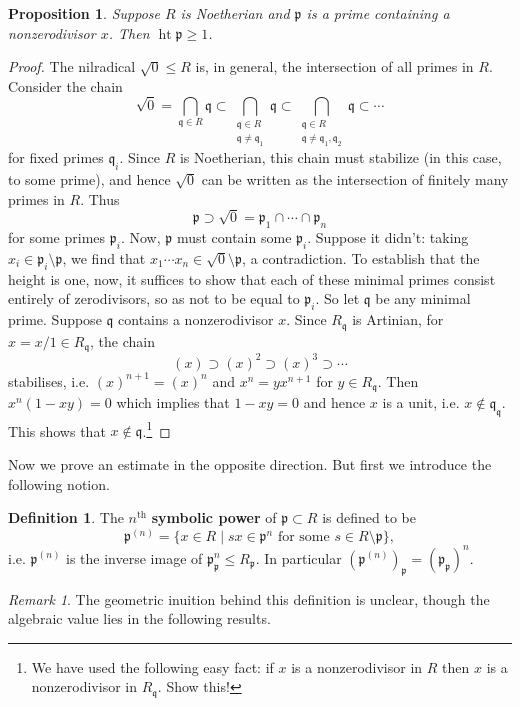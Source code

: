 \documentclass{article}
\newcommand{\fr}{\mathfrak}
\DeclareMathOperator{\hgt}{ht}
\theoremstyle{plain}
\newtheorem{prop}[thm]{Proposition}
\theoremstyle{definition}
\newtheorem{defn}{Definition}
\theoremstyle{remark}
\newtheorem*{rem}{Remark}
\begin{document}
\begin{prop}
    Suppose $R$ is Noetherian and $\fr p$ is a prime containing a nonzerodivisor $x$. Then $\hgt\fr p\geq 1$.
\end{prop}
\begin{proof}
    The nilradical $\sqrt{0}\leq R$ is, in general, the intersection of all primes in $R$. Consider the
    chain
    \[\sqrt{0}=\bigcap_{\fr q\in R}\fr q\subset \bigcap_{\substack{\fr q\in R\\\fr q\neq\fr q_1}}\fr q
        \subset \bigcap_{\substack{\fr q\in R\\\fr q\neq\fr q_1,\fr q_2}}\fr q\subset\cdots\]
    for fixed primes $\fr q_i$. Since $R$ is Noetherian, this chain must stabilize (in this case, to some prime), and hence $\sqrt{0}$
    can be written as the intersection of finitely many primes in $R$.
    Thus
    \[\fr p\supset \sqrt{0}=\fr p_1\cap\cdots\cap\fr p_n\]
    for some primes $\fr p_i$. Now, $\fr p$ must contain some
    $\fr p_i$. Suppose it didn't: taking $x_i\in \fr p_i\setminus \fr p$, we find that $x_1\cdots x_n\in\sqrt{0}\setminus\fr p$,
    a contradiction. To establish that the height is one, now, it suffices to show that each of these minimal primes
    consist entirely of zerodivisors, so as not to be equal to $\fr p_i$. So let $\fr q$ be any minimal prime.
    Suppose $\fr q$ contains a nonzerodivisor $x$. Since $R_{\fr q}$ is Artinian, for $x=x/1\in R_{\fr q}$,
    the chain
    \[(x)\supset (x)^2\supset (x)^3\supset\cdots\]
    stabilises, i.e. $(x)^{n+1}=(x)^n$ and $x^n=yx^{n+1}$ for $y\in R_{\fr q}$.
    Then $x^n(1-xy)=0$ which implies that $1-xy=0$ and hence $x$ is a unit, i.e. $x\notin \fr q_{\fr q}$. This
    shows that $x\notin\fr q$.\footnote{We have used the following easy fact: if $x$ is a
        nonzerodivisor in $R$ then $x$ is a nonzerodivisor in $R_{\fr q}$. Show this!}
\end{proof}

Now we prove an estimate in the opposite direction. But first we introduce the following notion.

\begin{defn}
    The $n^\text{th}$ \textbf{symbolic power} of $\fr p\subset R$ is defined to be
    \[\fr p^{(n)}=\{x\in R\mid sx\in\fr p^n\text{ for some }s\in R\setminus\fr p\},\]
    i.e. $\fr p^{(n)}$ is the inverse image of $\fr p_{\fr p}^n\leq R_{\fr p}$.
    In particular $(\fr p^{(n)})_{\fr p}=(\fr p_{\fr p})^{n}$.
\end{defn}

\begin{rem}
    The geometric inuition behind this definition is unclear, though the algebraic value lies in
    the following results.
\end{rem}
\end{document}
